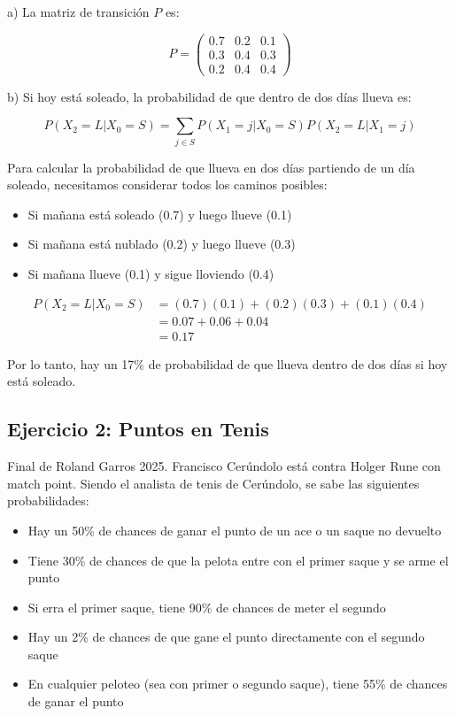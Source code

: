 \documentclass[a4paper,11pt]{article}
\begin{document}
a) La matriz de transición $P$ es:

\[P = \begin{pmatrix}
0.7 & 0.2 & 0.1 \\
0.3 & 0.4 & 0.3 \\
0.2 & 0.4 & 0.4
\end{pmatrix}\]

b) Si hoy está soleado, la probabilidad de que dentro de dos días llueva es:

\[P(X_2 = L | X_0 = S) = \sum_{j \in S} P(X_1 = j | X_0 = S)P(X_2 = L | X_1 = j)\]

Para calcular la probabilidad de que llueva en dos días partiendo de un día soleado, necesitamos considerar todos los caminos posibles:

\begin{itemize}
    \item Si mañana está soleado (0.7) y luego llueve (0.1)
    \item Si mañana está nublado (0.2) y luego llueve (0.3)
    \item Si mañana llueve (0.1) y sigue lloviendo (0.4)
\end{itemize}

\[
\begin{aligned}
P(X_2 = L | X_0 = S) &= (0.7)(0.1) + (0.2)(0.3) + (0.1)(0.4) \\
&= 0.07 + 0.06 + 0.04 \\
&= 0.17
\end{aligned}
\]

Por lo tanto, hay un 17\% de probabilidad de que llueva dentro de dos días si hoy está soleado.

\subsection{Ejercicio 2: Puntos en Tenis}

Final de Roland Garros 2025. Francisco Cerúndolo está contra Holger Rune con match point. Siendo el analista de tenis de Cerúndolo, se sabe las siguientes probabilidades:

\begin{itemize}
    \item Hay un 50\% de chances de ganar el punto de un ace o un saque no devuelto
    \item Tiene 30\% de chances de que la pelota entre con el primer saque y se arme el punto
    \item Si erra el primer saque, tiene 90\% de chances de meter el segundo
    \item Hay un 2\% de chances de que gane el punto directamente con el segundo saque
    \item En cualquier peloteo (sea con primer o segundo saque), tiene 55\% de chances de ganar el punto
\end{itemize}
\end{document}
